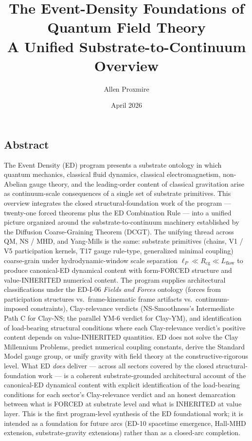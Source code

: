 \documentclass[
  11pt,a4paper]{article}
\title{The Event-Density Foundations of Quantum Field Theory\\
\large A Unified Substrate-to-Continuum Overview}
\author{Allen Proxmire}
\date{April 2026}
\begin{document}
\maketitle

\subsection{Abstract}\label{abstract}

The Event Density (ED) program presents a substrate ontology in which
quantum mechanics, classical fluid dynamics, classical electromagnetism,
non-Abelian gauge theory, and the leading-order content of classical
gravitation arise as continuum-scale consequences of a single set of
substrate primitives. This overview integrates the closed
structural-foundation work of the program --- twenty-one forced theorems
plus the ED Combination Rule --- into a unified picture organized around
the substrate-to-continuum machinery established by the Diffusion
Coarse-Graining Theorem (DCGT). The unifying thread across QM, NS / MHD,
and Yang-Mills is the same: substrate primitives (chains, V1 / V5
participation kernels, T17 gauge rule-type, generalized minimal
coupling) coarse-grain under hydrodynamic-window scale separation
\(\ell_P \ll R_\mathrm{cg} \ll L_\mathrm{flow}\) to produce canonical-ED
dynamical content with form-FORCED structure and value-INHERITED
numerical content. The program supplies architectural classifications
under the ED-I-06 \emph{Fields and Forces} ontology (forces from
participation structures vs.~frame-kinematic frame artifacts
vs.~continuum-imposed constraints), Clay-relevance verdicts
(NS-Smoothness's Intermediate Path C for Clay-NS; the parallel YM-6
verdict for Clay-YM), and identification of load-bearing structural
conditions where each Clay-relevance verdict's positive content depends
on value-INHERITED quantities. ED does not solve the Clay Millennium
Problems, predict numerical coupling constants, derive the Standard
Model gauge group, or unify gravity with field theory at the
constructive-rigorous level. What ED \emph{does} deliver --- across all
sectors covered by the closed structural-foundation work --- is a
coherent substrate-grounded architectural account of the canonical-ED
dynamical content with explicit identification of the load-bearing
conditions for each sector's Clay-relevance verdict and an honest
demarcation between what is FORCED at substrate level and what is
INHERITED at value layer. This is the first program-level synthesis of
the ED foundational work; it is intended as a foundation for future arcs
(ED-10 spacetime emergence, Hall-MHD extension, substrate-gravity
extensions) rather than as a closed-arc completion.
\end{document}
